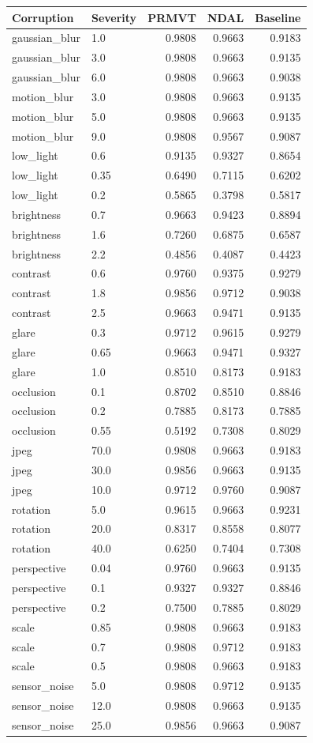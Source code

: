 \begin{tabular}{llrrr}
\hline
Corruption & Severity & PRMVT & NDAL & Baseline \\
\hline
gaussian_blur & 1.0 & 0.9808 & 0.9663 & 0.9183 \\
gaussian_blur & 3.0 & 0.9808 & 0.9663 & 0.9135 \\
gaussian_blur & 6.0 & 0.9808 & 0.9663 & 0.9038 \\
motion_blur & 3.0 & 0.9808 & 0.9663 & 0.9135 \\
motion_blur & 5.0 & 0.9808 & 0.9663 & 0.9135 \\
motion_blur & 9.0 & 0.9808 & 0.9567 & 0.9087 \\
low_light & 0.6 & 0.9135 & 0.9327 & 0.8654 \\
low_light & 0.35 & 0.6490 & 0.7115 & 0.6202 \\
low_light & 0.2 & 0.5865 & 0.3798 & 0.5817 \\
brightness & 0.7 & 0.9663 & 0.9423 & 0.8894 \\
brightness & 1.6 & 0.7260 & 0.6875 & 0.6587 \\
brightness & 2.2 & 0.4856 & 0.4087 & 0.4423 \\
contrast & 0.6 & 0.9760 & 0.9375 & 0.9279 \\
contrast & 1.8 & 0.9856 & 0.9712 & 0.9038 \\
contrast & 2.5 & 0.9663 & 0.9471 & 0.9135 \\
glare & 0.3 & 0.9712 & 0.9615 & 0.9279 \\
glare & 0.65 & 0.9663 & 0.9471 & 0.9327 \\
glare & 1.0 & 0.8510 & 0.8173 & 0.9183 \\
occlusion & 0.1 & 0.8702 & 0.8510 & 0.8846 \\
occlusion & 0.2 & 0.7885 & 0.8173 & 0.7885 \\
occlusion & 0.55 & 0.5192 & 0.7308 & 0.8029 \\
jpeg & 70.0 & 0.9808 & 0.9663 & 0.9183 \\
jpeg & 30.0 & 0.9856 & 0.9663 & 0.9135 \\
jpeg & 10.0 & 0.9712 & 0.9760 & 0.9087 \\
rotation & 5.0 & 0.9615 & 0.9663 & 0.9231 \\
rotation & 20.0 & 0.8317 & 0.8558 & 0.8077 \\
rotation & 40.0 & 0.6250 & 0.7404 & 0.7308 \\
perspective & 0.04 & 0.9760 & 0.9663 & 0.9135 \\
perspective & 0.1 & 0.9327 & 0.9327 & 0.8846 \\
perspective & 0.2 & 0.7500 & 0.7885 & 0.8029 \\
scale & 0.85 & 0.9808 & 0.9663 & 0.9183 \\
scale & 0.7 & 0.9808 & 0.9712 & 0.9183 \\
scale & 0.5 & 0.9808 & 0.9663 & 0.9183 \\
sensor_noise & 5.0 & 0.9808 & 0.9712 & 0.9135 \\
sensor_noise & 12.0 & 0.9808 & 0.9663 & 0.9135 \\
sensor_noise & 25.0 & 0.9856 & 0.9663 & 0.9087 \\
\hline
\end{tabular}
